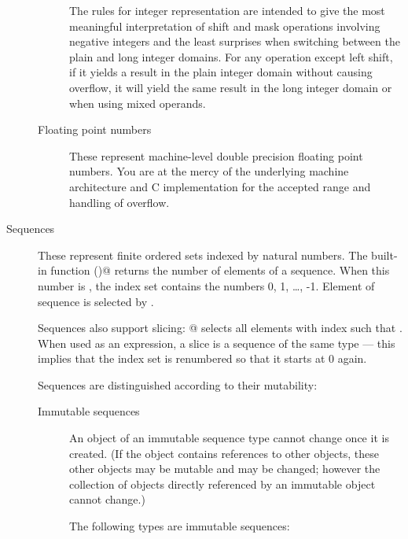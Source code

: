 \begin{description}
\begin{description}
The rules for integer representation are intended to give the most
meaningful interpretation of shift and mask operations involving
negative integers and the least surprises when switching between the
plain and long integer domains.  For any operation except left shift,
if it yields a result in the plain integer domain without causing
overflow, it will yield the same result in the long integer domain or
when using mixed operands.

\item[Floating point numbers]
These represent machine-level double precision floating point numbers.  
You are at the mercy of the underlying machine architecture and
C implementation for the accepted range and handling of overflow.

\end{description} %

\item[Sequences]
These represent finite ordered sets indexed by natural numbers.
The built-in function \verb@len()@ returns the number of elements
of a sequence.  When this number is , the index set contains
the numbers 0, 1, \ldots, -1.  Element  of sequence
 is selected by .

Sequences also support slicing: \verb@a[i:j]@ selects all elements
with index  such that  \code{<=}  \code{<}
.  When used as an expression, a slice is a sequence of the
same type --- this implies that the index set is renumbered so that it
starts at 0 again.

Sequences are distinguished according to their mutability:

\begin{description}
%
\item[Immutable sequences]
An object of an immutable sequence type cannot change once it is
created.  (If the object contains references to other objects,
these other objects may be mutable and may be changed; however
the collection of objects directly referenced by an immutable object
cannot change.)

The following types are immutable sequences:

\begin{description}


\end{description}
\end{description}
\end{description}
